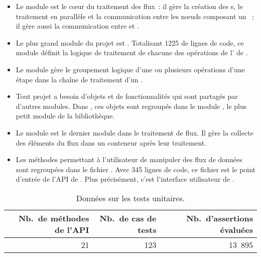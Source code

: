 \begin{itemize}
\item Le module  est le c\oe ur du traitement des flux~: il g\`ere la cr\'eation des s, le traitement en parall\`ele et la communication entre les n\oe uds composant un ~; il g\`ere aussi la communication entre  et .

\item Le plus grand module du projet est  . Totalisant 1225 de lignes de code, ce module d\'efinit la logique de traitement de chacune des op\'erations de l' de . 

\item Le module  g\`ere le groupement logique d'une ou plusieurs op\'erations d'une \'etape dans la cha\^ine de traitement d'un . 

\item Tout projet a besoin d'objets et de fonctionnalit\'es qui sont partag\'es par d'autres modules. Dans , ces objets sont regroup\'es dans le module , le plus petit module de la biblioth\`eque.

\item Le module  est le dernier module dans le traitement de flux. Il g\`ere la collecte des \'el\'ements du flux dans un conteneur apr\`es leur traitement.  
 
\item Les m\'ethodes permettant \`a l'utilisateur de manipuler des flux de donn\'ees sont regroup\'ees dans le fichier . Avec 345 lignes de code, ce fichier est le point d'entr\'ee de l'API de . Plus pr\'ecis\'ement, c'est l'interface utilisateur de . 

\end{itemize}

\begin{center}
\footnotesize
\begin{longtable}{|r|r|r|}
\caption{Donn\'ees sur les tests unitaires.\label{statistiquesUnitTest.tab}}\\
\hline

\textbf{Nb.\ de m\'ethodes de l'API} & \textbf{Nb.\ de cas de tests} & \textbf{Nb.\ d'assertions \'evalu\'ees}\\
\hline
\hline
	21 &
	123 &
	13~895
    \\                   
\hline    
\end{longtable}
\normalsize
\end{center} 

